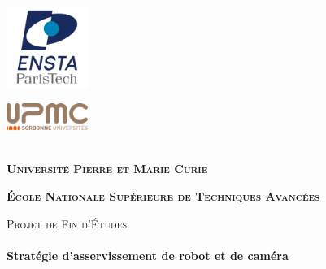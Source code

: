 \begin{titlepage}

	\begin{center}
	
		\begin{minipage}{0.45\textwidth}
		\begin{flushleft}
			\includegraphics[width=100px]{enstalogo.png}
		\end{flushleft}
		\end{minipage}
		\begin{minipage}{0.45\textwidth}
		\begin{flushright}
			\includegraphics[width=100px]{upmclogo.png}
		\end{flushright}
		\end{minipage}
		\mbox{}\\[1.5cm] 

		\textbf{ \textsc{\Large Université Pierre et Marie Curie}\\[0.5cm] }
		
		\textbf{ \textsc{\Large École Nationale Supérieure de Techniques Avancées}\\[0.5cm]}
		
		\vfill
	
		\textsc{\large Projet de Fin d'Études}\\[0.5cm]
	
		\HRule \\[0.4cm]
		{ \huge \bfseries Stratégie d'asservissement de robot et de caméra}\\[0.15cm]
	
		      \HRule \\[1.5cm]
	                

\end{center}
\end{titlepage}
